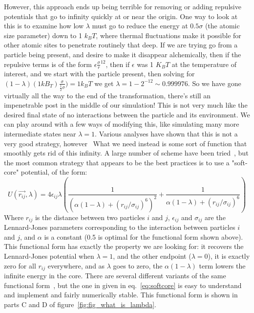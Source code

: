 \documentclass[9pt,bestpractices]{livecoms}
\begin{document}
%
However, this approach ends up being terrible for removing or adding repulsive potentials that go to infinity quickly at or near the origin. One way to look at this is to examine how low $\lambda$ must go to reduce the energy at $0.5\sigma$ (the atomic size parameter) down to 1 $k_BT$, where thermal fluctuations make it possible for other atomic sites to penetrate routinely that deep. If we are trying go from a particle being present, and desire to make it disappear alchemically, then if the repulsive terms is of the form $\epsilon\frac{\sigma}{r}^{12}$, then if $\epsilon$ was 1 $K_BT$ at the temperature of interest, and we start with the particle present, then solving for $(1-\lambda)(1 kB_T)\frac{\sigma}{\frac{1}{2}\sigma}) = 1 k_B T$ we get $\lambda = 1-2^{-12} \sim 0.999976$.  So we have gone virtually all the way to the end of the transformation, there's still an impenetrable post in the middle of our simulation! This is not very much like the desired final state of no interactions between the particle and its environment. We can play around with a few ways of modifying this, like simulating many more intermediate states near $\lambda=1$. Various analyses have shown that this is not a very good strategy, however~\cite{pham2011identifying, beutler1994avoiding, zacharias1994separationshifted, blondel2004ensemble}
%
What we need instead is some sort of function that smoothly gets rid of this infinity.  A large number of scheme have been tried~\cite{beutler1994avoiding, zacharias1994separationshifted, blondel2004ensemble, pham2011identifying, pham2012optimal, naden2014linear, donnini2005molecular}, but the most common strategy that appears to be the best practices is to use a "soft-core" potential, of the form:
%
\begin{equation}
    U(\vec{r_{ij}},\lambda) = 4\epsilon_{ij} \lambda \left(\frac{1}{(\alpha(1-\lambda) + (r_{ij}/\sigma_{ij})^6)^2} +  \frac{1}{\alpha(1-\lambda) + (r_{ij}/\sigma_{ij})^6}\right)\label{eq:softcore}
\end{equation}
Where $r_{ij}$ is the distance between two particles $i$ and $j$, $\epsilon_{ij}$ and $\sigma_{ij}$ are the Lennard-Jones parameters corresponding to the interaction between particles $i$ and $j$, and $\alpha$ is a constant (0.5 is optimal for the functional form shown above).  This functional form has exactly the property we are looking for: it recovers the Lennard-Jones potential when $\lambda=1$, and the other endpoint ($\lambda=0$), it is exactly zero for all $r_{ij}$ everywhere, and as $\lambda$ goes to zero, the  $\alpha(1-\lambda)$ term lowers the infinite energy in the core.  There are several different variants of the same functional form~\cite{zacharias1994separationshifted, beutler1994avoiding,pham2011identifying}, but the one in given in eq.~\ref{eq:softcore} is easy to understand and implement and fairly numerically stable. This functional form is shown in parts C and D of figure~\ref{fig:fig_what_is_lambda}.
\end{document}
